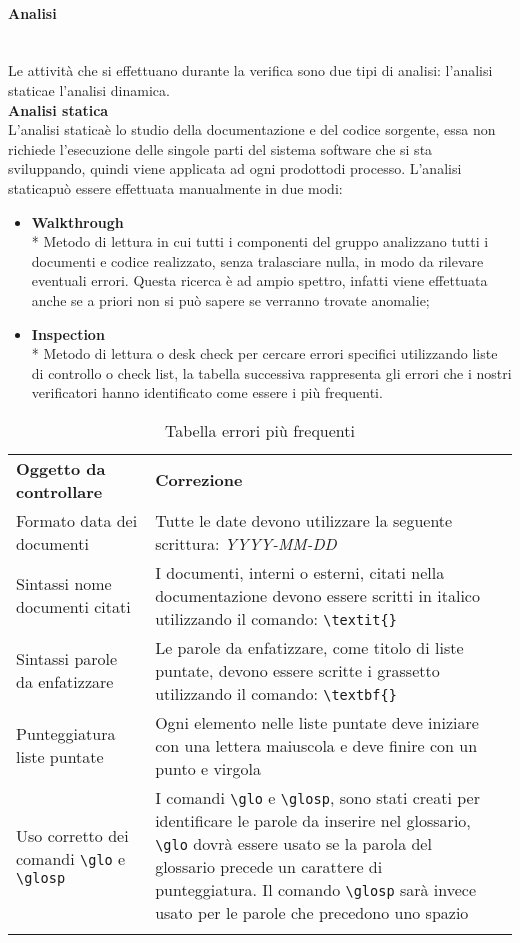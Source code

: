 \paragraph{Analisi}\mbox{}\\ [1mm]
Le attività che si effettuano durante la verifica sono due tipi di analisi: l'analisi statica\glosp e l'analisi dinamica. \\[2mm]
\textbf{Analisi statica}\mbox{}\\ [1mm]
L'analisi statica\glosp è lo studio della documentazione e del codice sorgente, essa non richiede l'esecuzione delle singole parti del sistema software che si sta sviluppando, quindi viene applicata ad ogni prodotto\glosp di processo\glo. L'analisi statica\glosp può essere effettuata manualmente in due modi:
\begin{itemize}
	\item \textbf{Walkthrough} \\*
	Metodo di lettura in cui tutti i componenti del gruppo analizzano tutti i documenti e codice realizzato, senza tralasciare nulla, in modo da rilevare eventuali errori. Questa ricerca è ad ampio spettro, infatti viene effettuata anche se a priori non si può sapere se verranno trovate anomalie;
	\item \textbf{Inspection} \\*
	Metodo di lettura o desk check per cercare errori specifici utilizzando liste di controllo o check list, la tabella successiva rappresenta gli errori che i nostri verificatori hanno identificato come essere i più frequenti.
\end{itemize}
\setcounter{table}{0}
\begin{longtable} {
		>{\centering}p{55mm} 
		>{\centering}p{55mm}
		>{}p{0mm}}
	\rowcolor{gray!50}
	\textbf{Oggetto da controllare} & \textbf{Correzione} & \TBstrut \\[2mm]
	Formato data dei documenti & Tutte le date devono utilizzare la seguente scrittura: \textit{YYYY-MM-DD}  &  \TBstrut \\[2mm]
	Sintassi nome documenti citati & I documenti, interni o esterni, citati nella documentazione devono essere scritti in italico utilizzando il comando: \verb|\textit{}|  &  \TBstrut \\[2mm]
	Sintassi parole da enfatizzare & Le parole da enfatizzare, come titolo di liste puntate, devono essere scritte i grassetto utilizzando il comando: \verb|\textbf{}|  &  \TBstrut \\[2mm]
	Punteggiatura liste puntate & Ogni elemento nelle liste puntate deve iniziare con una lettera maiuscola e deve finire con un punto e virgola &  \TBstrut \\[2mm]
	Uso corretto dei comandi \verb|\glo| e \verb|\glosp| & I comandi \verb|\glo| e \verb|\glosp|, sono stati creati per identificare le parole da inserire nel glossario, \verb|\glo| dovrà essere usato se la parola del glossario precede un carattere di punteggiatura. Il comando \verb|\glosp| sarà invece usato per le parole che precedono uno spazio &  \TBstrut \\	[2mm]
	\rowcolor{white}
	\caption{Tabella errori più frequenti}
\end{longtable}

